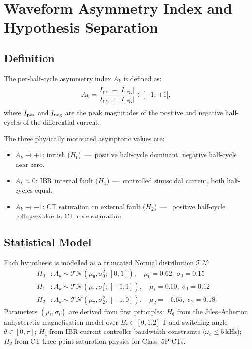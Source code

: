 \documentclass[journal,twoside,10pt]{IEEEtran}
\newcommand{\Ak}{A_k}
\begin{document}
\section{Waveform Asymmetry Index and Hypothesis Separation}
\label{sec:asymmetry}

\subsection{Definition}

The per-half-cycle asymmetry index $\Ak$ is defined as:
\begin{equation}
  \Ak = \frac{I_{\rm pos} - |I_{\rm neg}|}{I_{\rm pos} + |I_{\rm neg}|}
  \in [-1,\,+1],
  \label{eq:Ak}
\end{equation}
where $I_{\rm pos}$ and $I_{\rm neg}$ are the peak magnitudes of the
positive and negative half-cycles of the differential current.

The three physically motivated asymptotic values are:
\begin{itemize}
  \item $\Ak \to +1$: inrush ($H_0$)~---~positive half-cycle dominant,
        negative half-cycle near zero.
  \item $\Ak \approx 0$: IBR internal fault ($H_1$)~---~controlled
        sinusoidal current, both half-cycles equal.
  \item $\Ak \to -1$: CT saturation on external fault ($H_2$)~---~
        positive half-cycle collapses due to CT core saturation.
\end{itemize}

\subsection{Statistical Model}

Each hypothesis is modelled as a truncated Normal distribution $\mathcal{TN}$:
\begin{align}
  H_0 &: \Ak \sim \mathcal{TN}(\mu_0,\sigma_0^2;\,[0,1]),
  \quad \mu_0 = 0.62,\;\sigma_0 = 0.15 \label{eq:H0} \\
  H_1 &: \Ak \sim \mathcal{TN}(\mu_1,\sigma_1^2;\,[-1,1]),
  \quad \mu_1 = 0.00,\;\sigma_1 = 0.12 \label{eq:H1} \\
  H_2 &: \Ak \sim \mathcal{TN}(\mu_2,\sigma_2^2;\,[-1,0]),
  \quad \mu_2 = -0.65,\;\sigma_2 = 0.18 \label{eq:H2}
\end{align}
Parameters $(\mu_i, \sigma_i)$ are derived from first principles:
$H_0$ from the Jiles--Atherton anhysteretic magnetisation model over
$B_r \in [0, 1.2]\,$T and switching angle $\theta \in [0, \pi]$;
$H_1$ from IBR current-controller bandwidth constraints ($\omega_c \leq 5\,$kHz);
$H_2$ from CT knee-point saturation physics for Class~5P CTs.
\end{document}
